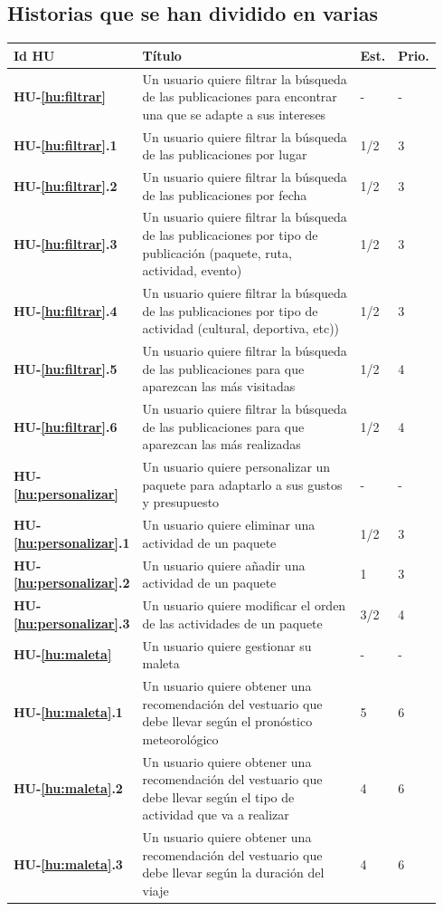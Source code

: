 \documentclass[11pt]{article}
\begin{document}
\subsection{Historias que se han dividido en varias}

\begin{longtable}{p{0.13\linewidth}p{0.67\linewidth}p{0.07\linewidth}p{0.07\linewidth}}
	\toprule
	\textbf{Id HU} & \textbf{Título} & \textbf{Est.} & \textbf{Prio.}\\
	\midrule
	
	\textbf{HU-\ref{hu:filtrar}} & Un usuario quiere filtrar la búsqueda de las publicaciones para encontrar una que se adapte a sus intereses & - & -\\ 
	\textbf{HU-\ref{hu:filtrar}.1} & Un usuario quiere filtrar la búsqueda de las publicaciones por lugar & 1/2 & 3\\ 
	\textbf{HU-\ref{hu:filtrar}.2} & Un usuario quiere filtrar la búsqueda de las publicaciones por fecha & 1/2 & 3\\ 
	\textbf{HU-\ref{hu:filtrar}.3} & Un usuario quiere filtrar la búsqueda de las publicaciones por tipo de publicación (paquete, ruta, actividad, evento) & 1/2 & 3\\ 
	\textbf{HU-\ref{hu:filtrar}.4} & Un usuario quiere filtrar la búsqueda de las publicaciones por tipo de actividad (cultural, deportiva, etc)) & 1/2 & 3\\ 
	\textbf{HU-\ref{hu:filtrar}.5} & Un usuario quiere filtrar la búsqueda de las publicaciones para que aparezcan las más visitadas & 1/2 & 4\\ 
	\textbf{HU-\ref{hu:filtrar}.6} & Un usuario quiere filtrar la búsqueda de las publicaciones para que aparezcan las más realizadas & 1/2 & 4\\ 
	\midrule
	\textbf{HU-\ref{hu:personalizar}} & Un usuario quiere personalizar un paquete para adaptarlo a sus gustos y presupuesto & - & - \\
	\textbf{HU-\ref{hu:personalizar}.1} & Un usuario quiere eliminar una actividad de un paquete & 1/2 & 3 \\ 
	\textbf{HU-\ref{hu:personalizar}.2} & Un usuario quiere añadir una actividad de un paquete & 1 & 3 \\ 
	\textbf{HU-\ref{hu:personalizar}.3} & Un usuario quiere modificar el orden de las actividades de un paquete & 3/2 & 4 \\
	\midrule 
	\textbf{HU-\ref{hu:maleta}} & Un usuario quiere gestionar su maleta & - & -\\
	\textbf{HU-\ref{hu:maleta}.1} & Un usuario quiere obtener una recomendación del vestuario que debe llevar según el pronóstico meteorológico & 5 & 6\\
	\textbf{HU-\ref{hu:maleta}.2} & Un usuario quiere obtener una recomendación del vestuario que debe llevar según el tipo de actividad que va a realizar & 4 & 6\\
	\textbf{HU-\ref{hu:maleta}.3} & Un usuario quiere obtener una recomendación del vestuario que debe llevar según la duración del viaje & 4 & 6\\
	\bottomrule
\end{longtable}
\end{document}
